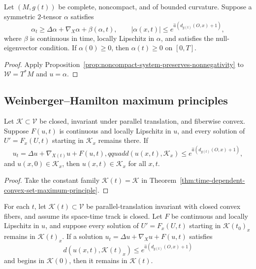 \begin{theorem}
\label{thm:noncompact-two-tensor-maximum-principle}
Let $(M,g(t))$ be complete, noncompact, and of bounded curvature.  Suppose a
symmetric $2$-tensor $\alpha$ satisfies
\[
\alpha_t\geq\Delta\alpha+\nabla_X\alpha+\beta(\alpha,t),
\qquad
|\alpha(x,t)|\leq e^{\widehat a(d_{g(t)}(O,x)+1)},
\]
where $\beta$ is continuous in time, locally Lipschitz in $\alpha$, and
satisfies the null-eigenvector condition.  If $\alpha(0)\geq0$, then
$\alpha(t)\geq0$ on $[0,T]$.
\end{theorem}

\begin{proof}
\sketch
{}
Apply Proposition~\ref{prop:noncompact-system-preserves-nonnegativity} to
$\mathcal W=T^*M$ and $u=\alpha$.
\end{proof}

\subsection{Weinberger--Hamilton maximum principles}

\begin{theorem}
\label{thm:weinberger-hamilton-noncompact-systems}
Let $\mathcal K\subset\mathcal V$ be closed, invariant under parallel
translation, and fiberwise convex.  Suppose $F(u,t)$ is continuous and locally
Lipschitz in $u$, and every solution of $U'=F_x(U,t)$ starting in
$\mathcal K_x$ remains there.  If
\[
u_t=\Delta u+\nabla_{X(t)}u+F(u,t),qquad
d(u(x,t),\mathcal K_x)\leq e^{\widehat a(d_{g(t)}(O,x)+1)},
\]
and $u(x,0)\in\mathcal K_x$, then $u(x,t)\in\mathcal K_x$ for all $x,t$.
\end{theorem}

\begin{proof}
\sketch
{}
Take the constant family $\mathcal K(t)=\mathcal K$ in
Theorem~\ref{thm:time-dependent-convex-set-maximum-principle}.
\end{proof}

\begin{theorem}
\label{thm:time-dependent-convex-set-maximum-principle}
For each $t$, let $\mathcal K(t)\subset\mathcal V$ be parallel-translation
invariant with closed convex fibers, and assume its space-time track is
closed.  Let $F$ be continuous and locally Lipschitz in $u$, and suppose every
solution of $U'=F_x(U,t)$ starting in $\mathcal K(t_0)_x$ remains in
$\mathcal K(t)_x$.  If a solution
$u_t=\Delta u+\nabla_Xu+F(u,t)$ satisfies
\[
d(u(x,t),\mathcal K(t)_x)\leq
e^{\widehat a(d_{g(t)}(O,x)+1)}
\]
and begins in $\mathcal K(0)$, then it remains in $\mathcal K(t)$.
\end{theorem}

